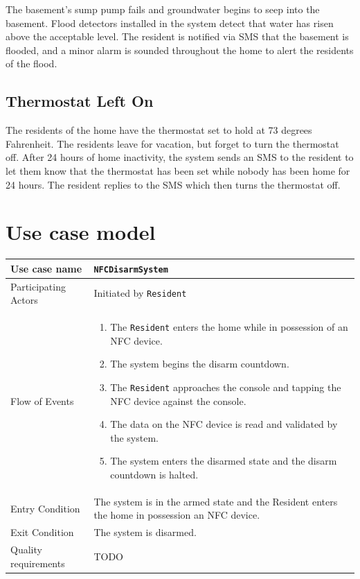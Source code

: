 \documentclass{report}
\begin{document}
The basement's sump pump fails and groundwater begins to seep into the
basement.  Flood detectors installed in the system detect that water has risen
above the acceptable level. The resident is notified via SMS that the basement
is flooded, and a minor alarm is sounded throughout the home to alert the
residents of the flood.

\subsection*{Thermostat Left On}

The residents of the home have the thermostat set to hold at 73 degrees
Fahrenheit.  The residents leave for vacation, but forget to turn the
thermostat off. After 24 hours of home inactivity, the system sends an SMS to
the resident to let them know that the thermostat has been set while nobody has
been home for 24 hours. The resident replies to the SMS which then turns the
thermostat off.

\section{Use case model}

\newlength{\originalParindent}
\setlength{\originalParindent}{\parindent}
\newlength{\originalParskip}
\setlength{\originalParskip}{\parskip}
\parindent 0pt
\parskip 10pt

\begin{tabular}{| l | p{12cm} |}
\hline
Use case name & \texttt{NFCDisarmSystem} \\ \hline
Participating Actors & Initiated by \texttt{Resident} \\ \hline
Flow of Events & 

\begin{enumerate}
 \item The \texttt{Resident} enters the home while in possession of an NFC 
        device.
 \item The system begins the disarm countdown.
 \item The \texttt{Resident} approaches the console and tapping the NFC device
       against the console.
 \item The data on the NFC device is read and validated by the system.
 \item The system enters the disarmed state and the disarm countdown is halted.
\end{enumerate}

\\ \hline

Entry Condition & The system is in the armed state and the Resident enters the
home in possession an NFC device. \\ \hline

Exit Condition & The system is disarmed. \\ \hline
Quality requirements & TODO \\ \hline

\hline
\end{tabular}
\end{document}
